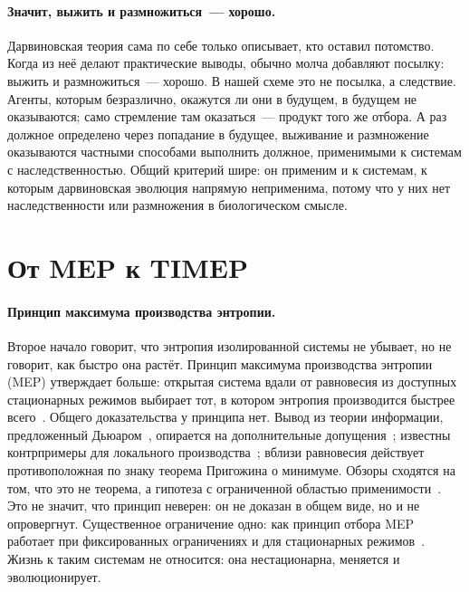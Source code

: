 \documentclass[11pt,a4paper]{article}
\begin{document}
\paragraph{Значит, выжить и размножиться~--- хорошо.}
Дарвиновская теория сама по себе только описывает, кто оставил потомство. Когда из неё делают практические выводы, обычно молча добавляют посылку: выжить и размножиться~--- хорошо. В нашей схеме это не посылка, а следствие. Агенты, которым безразлично, окажутся ли они в будущем, в будущем не оказываются; само стремление там оказаться~--- продукт того же отбора. А раз должное определено через попадание в будущее, выживание и размножение оказываются частными способами выполнить должное, применимыми к системам с наследственностью. Общий критерий шире: он применим и к системам, к которым дарвиновская эволюция напрямую неприменима, потому что у них нет наследственности или размножения в биологическом смысле.

\section{От MEP к TIMEP}\label{sec:timep}

\paragraph{Принцип максимума производства энтропии.}
Второе начало говорит, что энтропия изолированной системы не убывает, но не говорит, как быстро она растёт. Принцип максимума производства энтропии (MEP) утверждает больше: открытая система вдали от равновесия из доступных стационарных режимов выбирает тот, в котором энтропия производится быстрее всего~\cite{martyushev2006,kleidon2010}. Общего доказательства у принципа нет. Вывод из теории информации, предложенный Дьюаром~\cite{dewar2003}, опирается на дополнительные допущения~\cite{grinstein2007,bruers2007}; известны контрпримеры для локального производства~\cite{ross2012}; вблизи равновесия действует противоположная по знаку теорема Пригожина о минимуме. Обзоры сходятся на том, что это не теорема, а гипотеза с ограниченной областью применимости~\cite{martyushev2021}. Это не значит, что принцип неверен: он не доказан в общем виде, но и не опровергнут. Существенное ограничение одно: как принцип отбора MEP работает при фиксированных ограничениях и для стационарных режимов~\cite{canizares2023}. Жизнь к таким системам не относится: она нестационарна, меняется и эволюционирует.
\end{document}
